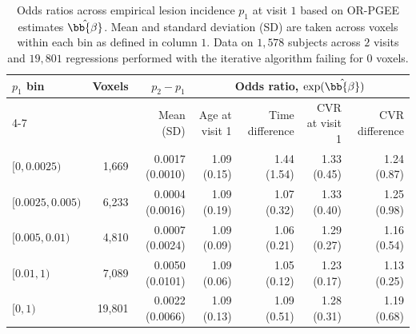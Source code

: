 \begin{table}[htbp]
\centering
\caption{Odds ratios across empirical lesion incidence $p_1$ at visit $1$ based on OR-PGEE estimates $\hat{\bb{\beta}}$. Mean and standard deviation (SD) are taken across voxels within each bin as defined in column $1$. Data on $1{,}578$ subjects across $2$ visits and $19{,}801$ regressions performed with the iterative algorithm failing for $0$ voxels.}
\label{tab:or-pgee-odds-ratio-by-incidence}
\setlength{\tabcolsep}{5pt}
\renewcommand{\arraystretch}{1.12}
\begin{tabular}{lrrrrrr}
\toprule
$p_1$ bin & Voxels & $p_2 - p_1$ & \multicolumn{4}{c}{Odds ratio, $\exp(\hat{\bb{\beta}})$} \\
\cmidrule(lr){4-7}
& & Mean (SD) & Age at visit 1 & Time difference & CVR at visit 1 & CVR difference \\
\midrule
$[0, 0.0025)$ & 1,669 & 0.0017 (0.0010) & 1.09 (0.15) & 1.44 (1.54) & 1.33 (0.45) & 1.24 (0.87) \\
$[0.0025, 0.005)$ & 6,233 & 0.0004 (0.0016) & 1.09 (0.19) & 1.07 (0.32) & 1.33 (0.40) & 1.25 (0.98) \\
$[0.005, 0.01)$ & 4,810 & 0.0007 (0.0024) & 1.09 (0.09) & 1.06 (0.21) & 1.29 (0.27) & 1.16 (0.54) \\
$[0.01, 1)$ & 7,089 & 0.0050 (0.0101) & 1.09 (0.06) & 1.05 (0.12) & 1.23 (0.17) & 1.13 (0.25) \\
\midrule
$[0, 1)$ & 19,801 & 0.0022 (0.0066) & 1.09 (0.13) & 1.09 (0.51) & 1.28 (0.31) & 1.19 (0.68) \\
\bottomrule
\end{tabular}
\end{table}
